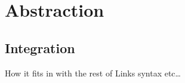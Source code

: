 \section{Abstraction}\label{sec:eval-abs}

\subsection{Integration}
How it fits in with the rest of Links syntax etc\dots